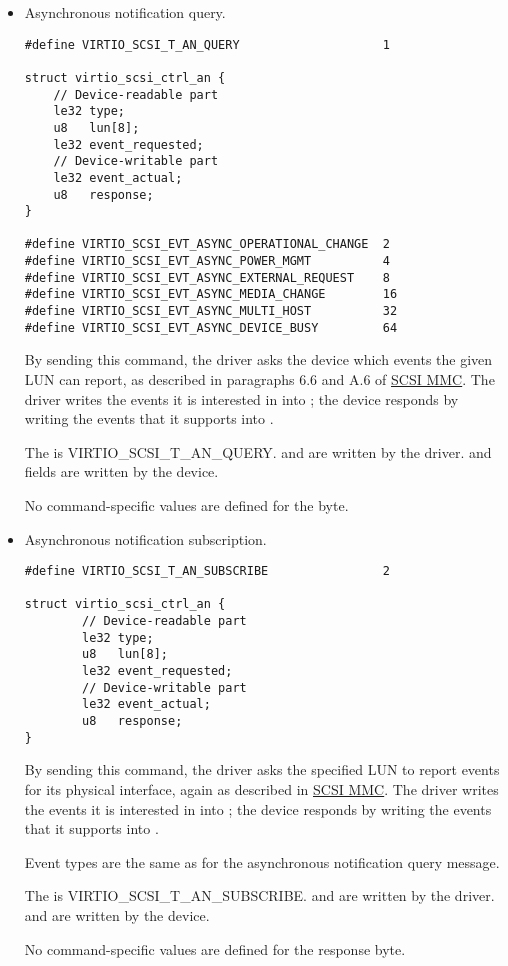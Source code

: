 \begin{itemize}
\item Asynchronous notification query.
\begin{lstlisting}
#define VIRTIO_SCSI_T_AN_QUERY                    1

struct virtio_scsi_ctrl_an {
    // Device-readable part
    le32 type;
    u8   lun[8];
    le32 event_requested;
    // Device-writable part
    le32 event_actual;
    u8   response;
}

#define VIRTIO_SCSI_EVT_ASYNC_OPERATIONAL_CHANGE  2
#define VIRTIO_SCSI_EVT_ASYNC_POWER_MGMT          4
#define VIRTIO_SCSI_EVT_ASYNC_EXTERNAL_REQUEST    8
#define VIRTIO_SCSI_EVT_ASYNC_MEDIA_CHANGE        16
#define VIRTIO_SCSI_EVT_ASYNC_MULTI_HOST          32
#define VIRTIO_SCSI_EVT_ASYNC_DEVICE_BUSY         64
\end{lstlisting}

  By sending this command, the driver asks the device which
  events the given LUN can report, as described in paragraphs 6.6
  and A.6 of \hyperref[intro:SCSI MMC]{SCSI MMC}. The driver writes the
  events it is interested in into ; the device
  responds by writing the events that it supports into
  .

  The  is VIRTIO_SCSI_T_AN_QUERY.  and 
  are written by the driver.  and 
  fields are written by the device.

  No command-specific values are defined for the  byte.

\item Asynchronous notification subscription.
\begin{lstlisting}
#define VIRTIO_SCSI_T_AN_SUBSCRIBE                2

struct virtio_scsi_ctrl_an {
        // Device-readable part
        le32 type;
        u8   lun[8];
        le32 event_requested;
        // Device-writable part
        le32 event_actual;
        u8   response;
}
\end{lstlisting}

  By sending this command, the driver asks the specified LUN to
  report events for its physical interface, again as described in
   \hyperref[intro:SCSI MMC]{SCSI MMC}. The driver writes the events it is
  interested in into ; the device responds by
  writing the events that it supports into .

  Event types are the same as for the asynchronous notification
  query message.

  The  is VIRTIO_SCSI_T_AN_SUBSCRIBE.  and
   are written by the driver.
   and  are written by the device.

  No command-specific values are defined for the response byte.
\end{itemize}

